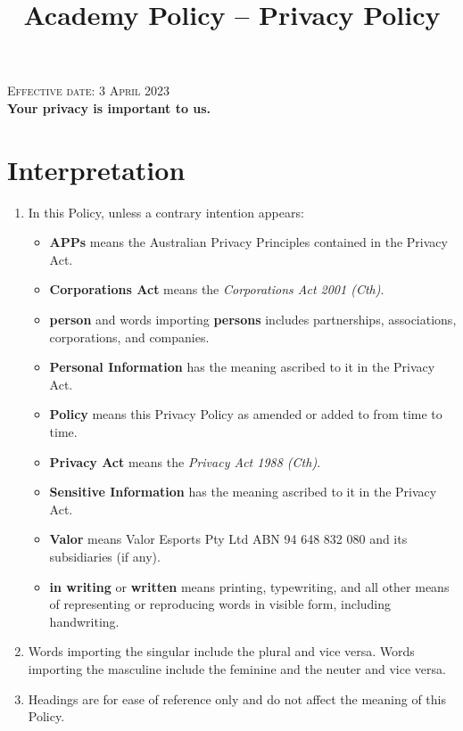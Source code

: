 \documentclass[10pt]{article}
\begin{document}
\title{Academy Policy -- Privacy Policy}

\textsc{Effective date: 3 April 2023} \\

\textbf{Your privacy is important to us.}


\section{Interpretation}

\begin{enumerate}[(1)]
\item 
In this Policy, unless a contrary intention appears:
	\begin{itemize}
	\item[]
	\textbf{APPs} means the Australian Privacy Principles contained in the Privacy Act.
	
	\item[]
	\textbf{Corporations Act} means the \textit{Corporations Act 2001 (Cth)}.
	
	\item[]
	\textbf{person} and words importing \textbf{persons} includes partnerships, associations, corporations, and companies.
	
	\item[]
	\textbf{Personal Information} has the meaning ascribed to it in the Privacy Act.
	
	\item[]
	\textbf{Policy} means this Privacy Policy as amended or added to from time to time.
	
	\item[]
	\textbf{Privacy Act} means the \textit{Privacy Act 1988 (Cth)}.
	
	\item[]
	\textbf{Sensitive Information} has the meaning ascribed to it in the Privacy Act.
	
	\item[]
	\textbf{Valor} means Valor Esports Pty Ltd ABN 94 648 832 080 and its subsidiaries (if any).
	
	\item[]
	\textbf{in writing} or \textbf{written} means printing, typewriting, and all other means of representing or reproducing words in visible form, including handwriting.
	\end{itemize}

\item
Words importing the singular include the plural and vice versa. Words importing the masculine include the feminine and the neuter and vice versa.

\item
Headings are for ease of reference only and do not affect the meaning of this Policy.
\end{enumerate}
\end{document}
